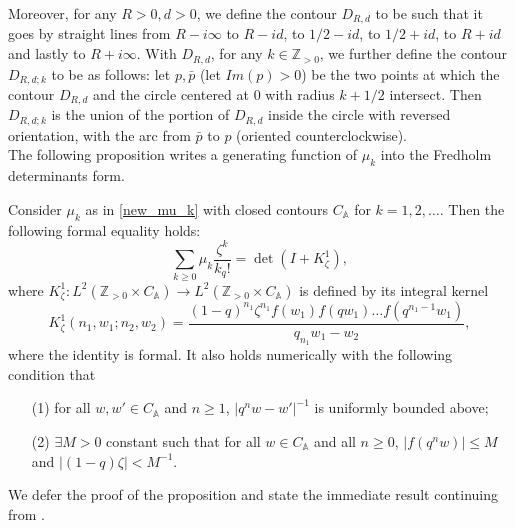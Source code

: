 Moreover, for any $R > 0, d > 0$, we define the contour $D_{R,d}$ to be such that it goes by straight lines from $R - i\infty$ to $R - i d$, to $1/2 - i d$, to $1/2 + id$, to $R + id$ and lastly to $R+i\infty$. With $D_{R,d}$, for any $k \in \mathbb{Z}_{>0}$, we further define the contour $D_{R,d;k}$ to be as follows: let $p, \bar{p}$ (let $Im(p) > 0$) be the two points at which the contour $D_{R,d}$ and the circle centered at 0 with radius $k+1/2$ intersect. Then $D_{R,d;k}$ is the union of the portion of $D_{R,d}$ inside the circle with reversed orientation, with the arc from $\bar{p}$ to $p$ (oriented counterclockwise). \\

The following proposition writes a generating function of $\mu_k$ into the Fredholm determinants form.
\begin{proposition}
\label{step-1-mellin-barnes}
Consider $\mu_k$ as in \eqref{new_mu_k} with closed contours $C_{\mathbb{A}}$ for $k = 1,2,\dots$. Then the following formal equality holds:
$$\sum_{k \ge 0} \mu_k \frac{\zeta^k}{k_q!} = \det(I+K_{\zeta}^{1}),$$ where $K_{\zeta}^1:L^2(\mathbb{Z}_{>0} \times C_{\mathbb{A}}) \rightarrow L^2(\mathbb{Z}_{>0} \times C_{\mathbb{A}})$ is defined by its integral kernel $$K_{\zeta}^1(n_1, w_1; n_2, w_2)= \frac{(1-q)^{n_1} \zeta^{n_1} f(w_1) f(qw_1) \dots f(q^{n_1-1}w_1)}{q_{n_1}w_1 - w_2},$$
where the identity is formal. It also holds numerically with the following condition that
\begin{enumerate}
\item[(1)] for all $w, w' \in C_{\mathbb{A}}$ and $n \ge 1$, $|q^n w - w'|^{-1}$ is uniformly bounded above;
\item[(2)] $\exists M > 0$ constant such that for all $w \in C_{\mathbb{A}}$ and all $n \ge 0$, $|f(q^n w)| \le M$ and $|(1-q) \zeta| < M^{-1}$.
\end{enumerate}
\end{proposition}

We defer the proof of the proposition and state the immediate result continuing from .

